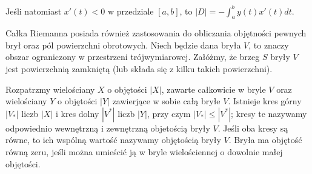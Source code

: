 \documentclass[leqno]{article}
\begin{document}
\begin{justify}
\noindent
Jeśli natomiast $x'(t) < 0$ w przedziale $[a,b]$, to $|D| = -\int_{a}^{b}y(t)x'(t)dt$.

Całka Riemanna posiada również zastosowania do obliczania objętności pewnych brył oraz pól powierzchni obrotowych.
Niech będzie dana bryła $V$, to znaczy obszar ograniczony w przestrzeni trójwymiarowej.
Załóżmy, że brzeg $S$ bryły $V$ jest powierzchnią zamkniętą (lub składa się z kilku takich powierzchni).

\begin{defn}
    Rozpatrzmy wielościany $X$ o objętości $|X|$, zawarte całkowicie w bryle $V$ oraz wielościany
    $Y$ o objętości $|Y|$ zawierjące w sobie całą bryłe $V$. Istnieje kres górny
    $|V_*|$ liczb $|X|$ i kres dolny $|V^*|$ liczb $|Y|$, przy czym $|V_*| \leqslant |V^*|$; kresy te nazywamy
    odpowiednio wewnętrzną i zewnętrzną objetością bryły $V$. Jeśli oba kresy są równe, to ich wspólną
    wartość nazywamy objętością bryły $V$. Bryła ma objętość równą zeru, jeśli można umieścić ją w bryle
    wielościennej o dowolnie małej objętości.
\end{defn}


\end{justify}
\end{document}
